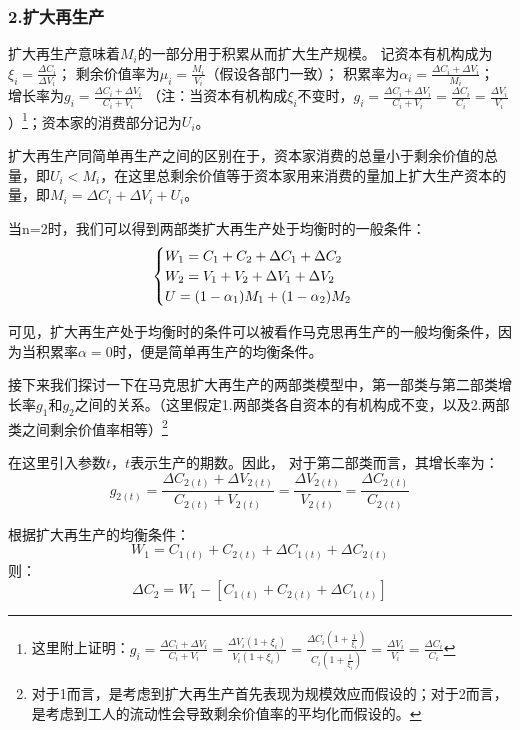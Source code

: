 \documentclass[a4paper,twoside,12pt,AutoFakeBold]{ctexart}
\begin{document}
\subsubsection{2.扩大再生产}

扩大再生产意味着$M_i$的一部分用于积累从而扩大生产规模。
记资本有机构成为\(\xi_i=\frac{\Delta C_i}{\Delta V_i}\)；
剩余价值率为\(\mu_i=\frac{M_i}{V_i}\)（假设各部门一致）；
积累率为$\alpha_i=\frac{\Delta C_i + \Delta V_i}{M_i}$；
增长率为$g_i = \frac{\Delta C_i + \Delta V_i}{C_i + V_i}
$
（注：当资本有机构成$\xi_i$不变时，$g_i=\frac{\Delta C_i + \Delta V_i}{C_i + V_i}=\frac{\Delta C_i}{C_i}=\frac{\Delta V_i}{V_i}$）\footnote{这里附上证明：$g_i=\frac{\Delta C_i + \Delta V_i}{C_i + V_i } = \frac{\Delta V_i (1+\xi_i)}{ V_i (1+\xi_i)} =\frac{\Delta C_i(1+\frac{1}{\xi_i})}{C_i(1+\frac{1}{\xi_i})} =\frac{\Delta V_i}{V_i} = \frac{\Delta C_i}{C_i} $}；资本家的消费部分记为$U_i$。

扩大再生产同简单再生产之间的区别在于，资本家消费的总量小于剩余价值的总量，即$U_i<M_i$，在这里总剩余价值等于资本家用来消费的量加上扩大生产资本的量，即$M_i=\Delta C_i +\Delta V_i + U_i$。

当n=2时，我们可以得到两部类扩大再生产处于均衡时的一般条件：
\begin{equation}
 \begin{cases}
 W_1 = C_1+C_2+\Delta C_1+\Delta C_2\\ 
  W_2 = V_1+V_2+\Delta V_1+\Delta V_2\\
U = (1-\alpha_1)M_1+(1-\alpha_2)M_2     
 \end{cases} \notag   
\end{equation}

可见，扩大再生产处于均衡时的条件可以被看作马克思再生产的一般均衡条件，因为当积累率$\alpha = 0$时，便是简单再生产的均衡条件。

接下来我们探讨一下在马克思扩大再生产的两部类模型中，第一部类与第二部类增长率$g_1$和$g_2$之间的关系。（这里假定1.两部类各自资本的有机构成不变，以及2.两部类之间剩余价值率相等）\footnote{对于1而言，是考虑到扩大再生产首先表现为规模效应而假设的；对于2而言，是考虑到工人的流动性会导致剩余价值率的平均化而假设的。}

在这里引入参数$t$，$t$表示生产的期数。因此，
对于第二部类而言，其增长率为：
$$
g_{2(t)}=\frac{\Delta C_{2(t)} + \Delta V_{2(t)}}{C_{2(t)} + V_{2(t)}}=\frac{\Delta V_{2(t)}}{V_{2(t)}} = \frac{\Delta C_{2(t)}}{C_{2(t)}} 
$$

根据扩大再生产的均衡条件：
$$
  W_1 = C_{1(t)}+C_{2(t)}+\Delta C_{1(t)}+\Delta C_{2(t)}
$$
则：
$$
\Delta C_2=W_1 -[C_{1(t)}+C_{2(t)}+\Delta C_{1(t)}]
$$
\end{document}
